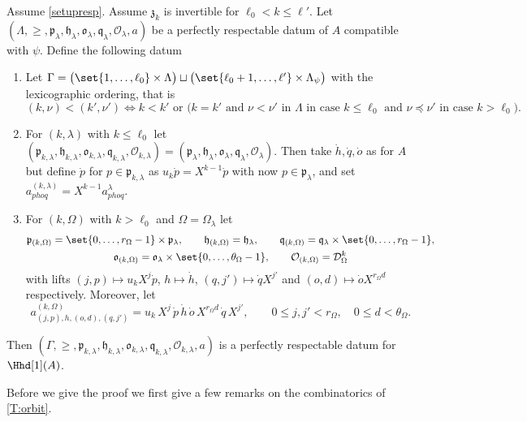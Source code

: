 \documentclass[a4paper,11pt]{amsart}
\numberwithin{equation}{subsection}
\theoremstyle{definition}
\theoremstyle{theorem}
\theoremstyle{remark}
\newcommand\CO{\mathcal{O}}
\newcommand\kapp{{\mathfrak{z}}}
\newcommand\plam[1][\lambda]{\mathfrak{p}_{#1}}
\newcommand\hlam[1][\lambda]{\mathfrak{h}_{#1}}
\newcommand\qlam[1][\lambda]{\mathfrak{q}_{#1}}
\newcommand\Olam[1][\lambda]{\CO_{#1}}
\newcommand\olam[1][\lambda]{\mathfrak{o}_{#1}}
\begin{document}
\begin{Theorem}\label{T:orbit}Assume \autoref{setupresp}. Assume $\kapp_k$ is invertible for $\ell_0<k\le\ell'$.
  Let $(\Lambda,\ge,\plam,\hlam,\olam,\qlam,\Olam,a)$ be a perfectly respectable datum of $A$ compatible with $\psi$. Define the following datum
    \begin{enumerate}
    \item\label{orbit1} Let  $\Gamma=\bigl(\set{1,\dots,\ell_0}\times\Lambda\bigr)
          \sqcup\bigl(\set{\ell_0+1,\dots,\ell'}\times\Lambda_\psi\bigr)$
       with the lexicographic ordering, that is
      \[(k,\nu)<(k',\nu')\Longleftrightarrow \text{$k<k'$ or ($k=k'$ and $\nu<\nu'$ in $\Lambda$ in case
      $k\le\ell_0$ and $\nu\preceq\nu'$ in case $k>\ell_0$)}.\]
    \item\label{orbit2}  For $(k,\lambda)$ with $k\le\ell_0$ let $(\plam[k,\lambda],\hlam[k,\lambda],\olam[k,\lambda],\qlam[k,\lambda],\Olam[k,\lambda])=(\plam,\hlam,\olam,\qlam,\Olam)$. Then take $\dot h, \dot q, \dot o$ as for $A$ but define $\dot p$ for $p\in\plam[k,\lambda]$ as $u_k\dot p=X^{k-1}\dot p$ with now $p\in\plam$, and set $a^{(k,\lambda)}_{phoq}=X^{k-1}a^{\lambda}_{phoq}$.
    \item\label{orbit3} For $(k,\Omega)$ with $k>\ell_0$ and $\Omega=\Omega_\lambda$ let
      \begin{gather*}
        \plam[(k,\Omega)]=\set{0,\dots,r_\Omega-1}\times\plam,\qquad
        \hlam[(k,\Omega)]=\hlam,\qquad
        \qlam[(k,\Omega)]=\qlam\times\set{0,\dots,r_\Omega-1},\\
        \olam[(k,\Omega)]=\olam\times\set{0,\dots,\theta_\Omega-1},\qquad
        \Olam[(k,\Omega)]=\mathcal{D}^{k}_\Omega
      \end{gather*}
      with lifts $(j,p)\mapsto u_kX^{j}\dot p$, $h\mapsto\dot h$, $(q,j')\mapsto\dot qX^{j'}$ and
      $(o,d)\mapsto\dot oX^{r_\Omega d}$ respectively. Moreover, let
      \begin{equation}\label{E:orbitE}
        a^{(k,\Omega)}_{(j,p),h,(o,d),(q,j')}
          =u_k\,X^{j}\,\dot p\,\dot h\,\dot o\,X^{r_\Omega d}\,\dot q\,X^{j'},
        \qquad 0\le j,j'<r_\Omega,\quad 0\le d<\theta_\Omega .
      \end{equation}
  \end{enumerate}
  Then $(\Gamma,\ge,\plam[k,\lambda],\hlam[k,\lambda],\olam[k,\lambda],\qlam[k,\lambda],\Olam[k,\lambda],a)$
 is a perfectly respectable datum for  $\Hhd[1](A)$.
\end{Theorem}
Before we give the proof we first give a few remarks on the combinatorics of \autoref{T:orbit}.
\end{document}
